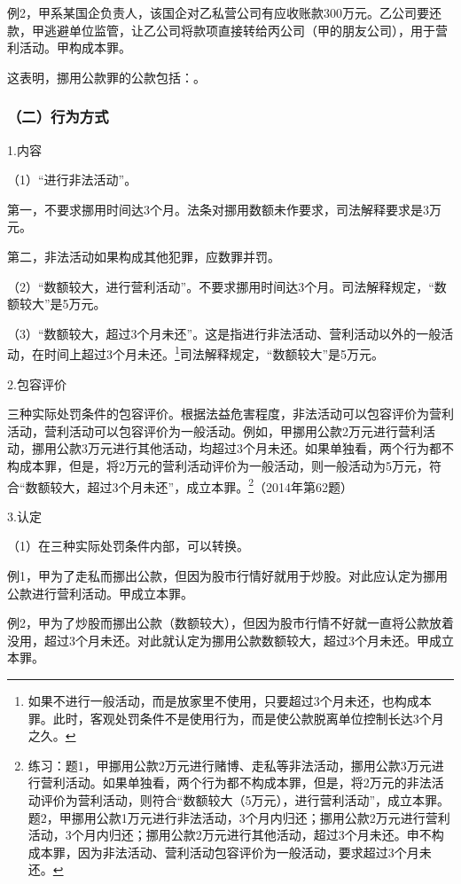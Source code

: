 例2，甲系某国企负责人，该国企对乙私营公司有应收账款300万元。乙公司要还款，甲逃避单位监管，让乙公司将款项直接转给丙公司（甲的朋友公司），用于营利活动。甲构成本罪。

这表明，挪用公款罪的公款包括：。

\subsubsection*{（二）行为方式}

1.内容

（1）“进行非法活动”。

第一，不要求挪用时间达3个月。法条对挪用数额未作要求，司法解释要求是3万元。

第二，非法活动如果构成其他犯罪，应数罪并罚。

（2）“数额较大，进行营利活动”。不要求挪用时间达3个月。司法解释规定，“数额较大”是5万元。

（3）“数额较大，超过3个月未还”。这是指进行非法活动、营利活动以外的一般活动，在时间上超过3个月未还。\footnote{如果不进行一般活动，而是放家里不使用，只要超过3个月未还，也构成本罪。此时，客观处罚条件不是使用行为，而是使公款脱离单位控制长达3个月之久。}司法解释规定，“数额较大”是5万元。

2.包容评价

三种实际处罚条件的包容评价。根据法益危害程度，非法活动可以包容评价为营利活动，营利活动可以包容评价为一般活动。例如，甲挪用公款2万元进行营利活动，挪用公款3万元进行其他活动，均超过3个月未还。如果单独看，两个行为都不构成本罪，但是，将2万元的营利活动评价为一般活动，则一般活动为5万元，符合“数额较大，超过3个月未还”，成立本罪。\footnote{练习：题1，甲挪用公款2万元进行赌博、走私等非法活动，挪用公款3万元进行营利活动。如果单独看，两个行为都不构成本罪，但是，将2万元的非法活动评价为营利活动，则符合“数额较大（5万元），进行营利活动”，成立本罪。题2，甲挪用公款1万元进行非法活动，3个月内归还；挪用公款2万元进行营利活动，3个月内归还；挪用公款2万元进行其他活动，超过3个月未还。申不构成本罪，因为非法活动、营利活动包容评价为一般活动，要求超过3个月未还。}（2014年第62题）

3.认定

（1）在三种实际处罚条件内部，可以转换。

例1，甲为了走私而挪出公款，但因为股市行情好就用于炒股。对此应认定为挪用公款进行营利活动。甲成立本罪。

例2，甲为了炒股而挪出公款（数额较大），但因为股市行情不好就一直将公款放着没用，超过3个月未还。对此就认定为挪用公款数额较大，超过3个月未还。甲成立本罪。

